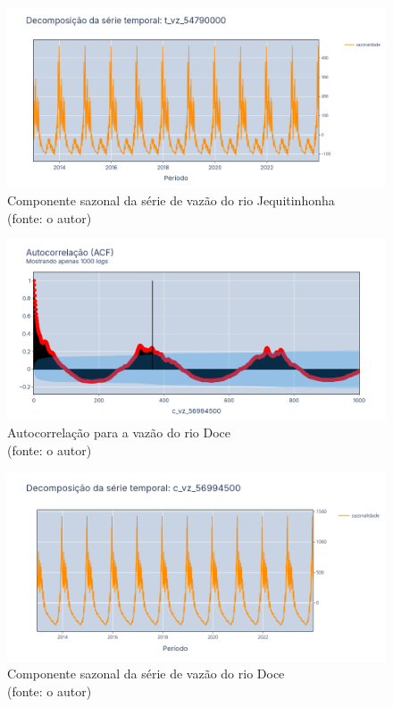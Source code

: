\begin{figure}[!h]
	\centering
	\includegraphics[scale=0.33]{Figuras/jequiti/sazonalidade_jequitinhonha.png}
	\caption{Componente sazonal da série de vazão do rio Jequitinhonha\\(fonte: o autor)}
	\label{fig:sazonalidade_jequitinhonha}
\end{figure}

\begin{figure}[!h]
	\centering
	\includegraphics[scale=0.33]{Figuras/rio_doce/acf_rio_doce.png}
	\caption{Autocorrelação para a vazão do rio Doce\\(fonte: o autor)}
	\label{fig:acf_rio_doce}
\end{figure}

\begin{figure}[!h]
	\centering
	\includegraphics[scale=0.33]{Figuras/rio_doce/sazonalidade_rio_doce.png}
	\caption{Componente sazonal da série de vazão do rio Doce\\(fonte: o autor)}
	\label{fig:sazonalidade_rio_doce}
\end{figure}

